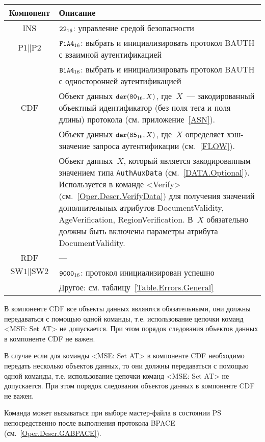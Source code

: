 \begin{table}[hbt]
\caption{}\label{Table.Oper.SetBAUTHCmd}
\begin{tabular}{|c|p{14cm}|}
\hline
Компонент & Описание \\
\hline
\hline
INS & $\texttt{22}_{16}$: управление средой безопасности\\ 
\hline
$\text{P1} \parallel\text{P2}$ & $\texttt{F1A4}_{16}$: выбрать и 
инициализировать протокол BAUTH с взаимной 
аутентификацией \\ 
\cline{2-2}
 & $\texttt{B1A4}_{16}$: выбрать и инициализировать протокол BAUTH с 
односторонней аутентификацией\\
\hline
CDF & Объект данных 
$\texttt{der}(\texttt{80}_{16}, X)$, где~$X$~--- 
закодированный объектный идентификатор (без поля тега и поля 
длины) протокола (см. приложение~\ref{ASN}).\\
 & Объект данных $\texttt{der}(\texttt{85}_{16}, X)$, 
где~$X$ определяет хэш-значение запроса аутентификации (см.~\ref{FLOW}).\\
 & Объект данных~$X$, который является 
закодированным значением типа \verb|AuthAuxData| (см.~\ref{DATA.Optional}). 
Используется в команде <Verify> (см.~\ref{Oper.Descr.VerifyData}) 
для получения значений дополнительных атрибутов DocumentValidity, 
AgeVerification, RegionVerification. В~$X$ 
обязательно должны быть включены параметры атрибута DocumentValidity.\\
\hline 
\hline
RDF &  --- \\
\hline
$\text{SW1} \parallel \text{SW2}$ 
  & $\texttt{9000}_{16}$: протокол инициализирован успешно \\
\cline{2-2}
  & Другое: см. таблицу~\ref{Table.Errors.General}\\
\hline
\end{tabular}
\end{table}

В компоненте CDF все объекты данных являются обязательными, 
они должны передаваться с помощью одной команды, 
т.е. использование цепочки команд <MSE: Set AT> не допускается. 
При этом порядок следования объектов данных в компоненте CDF не важен. 

В случае если для команды <MSE: Set AT> в компоненте CDF необходимо 
передать несколько объектов данных, то они должны передаваться с помощью 
одной команды, т.е. использование цепочки команд <MSE: Set AT> не 
допускается. При этом порядок следования объектов данных в компоненте CDF 
не важен. 
\fi

Команда может вызываться при выборе мастер-файла в состоянии PS 
непосредственно после выполнения протокола BPACE 
(см.~\ref{Oper.Descr.GABPACE}). 

